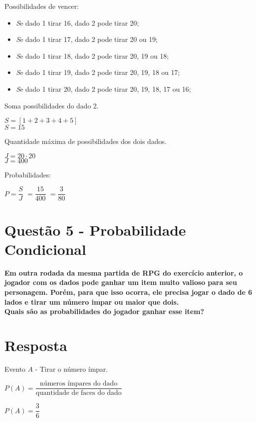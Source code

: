 \documentclass[a4paper, 12pt]{article}
\begin{document}
{Possibilidades de vencer:

\begin{itemize}
  \item \textit Se dado 1 tirar 16, dado 2 pode tirar 20;
  \item \textit Se dado 1 tirar 17, dado 2 pode tirar 20 ou 19;
  \item \textit Se dado 1 tirar 18, dado 2 pode tirar 20, 19 ou 18;
  \item \textit Se dado 1 tirar 19, dado 2 pode tirar 20, 19, 18 ou 17;
  \item \textit Se dado 1 tirar 20, dado 2 pode tirar 20, 19, 18, 17 ou 16;
  
\end{itemize}

Soma possibilidades do dado 2.  
\begin{center}
  $S = [1 + 2 + 3 + 4 + 5]$ \\
  $S = 15$
\end{center}
Quantidade máxima de possibilidades dos dois dados.
\begin{center}
  $J = 20 \cdot 20 $ \\
  $J = 400$
\end{center} 
Probabilidades:

\begin{center}
  $P = \dfrac{S}{J}$
  $ = \dfrac{15}{400}$
  $ = \dfrac{3}{80}$
\end{center}
\newpage
\section*{Questão 5 - Probabilidade Condicional}
{\bfseries Em outra rodada da mesma partida de RPG do exercício anterior, o jogador com os dados pode ganhar um item muito valioso para seu personagem. Porém, para que isso ocorra, ele precisa jogar o dado de 6 lados e tirar um número impar ou maior que dois. \\
Quais são as probabilidades do jogador ganhar esse item?}

\section*{Resposta}
Evento $A$ - Tirar o número ímpar.
\newline
\begin{center}
  $P(A) = \dfrac{\text{números ímpares do dado}}{\text{quantidade de faces do dado}}$

  $P(A) = \dfrac{3}{6}$\\
\end{center}

}
\end{document}
